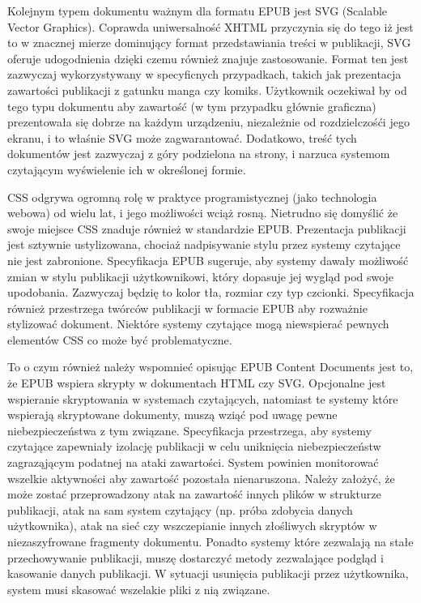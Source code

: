 Kolejnym typem dokumentu ważnym dla formatu EPUB jest SVG (Scalable Vector Graphics). Coprawda uniwersalność XHTML przyczynia się do
tego iż jest to w znacznej mierze dominujący format przedstawiania treści w publikacji, SVG oferuje udogodnienia dzięki czemu również
znajuje zastosowanie. Format ten jest zazwyczaj wykorzystywany w specyficnych przypadkach, takich jak prezentacja zawartości publikacji
z gatunku manga czy komiks. Użytkownik oczekiwał by od tego typu dokumentu aby zawartość (w tym przypadku głównie graficzna) prezentowała
się dobrze na każdym urządzeniu, niezależnie od rozdzielczośći jego ekranu, i to właśnie SVG może zagwarantować. Dodatkowo, treść tych
dokumentów jest zazwyczaj z góry podzielona na strony, i narzuca systemom czytającym wyświelenie ich w określonej formie.

CSS odgrywa ogromną rolę w praktyce programistycznej (jako technologia webowa) od wielu lat, i jego możliwości wciąż rosną. Nietrudno się
domyślić że swoje miejsce CSS znaduje również w standardzie EPUB. Prezentacja publikacji jest sztywnie ustylizowana, chociaż nadpisywanie
stylu przez systemy czytające nie jest zabronione. Specyfikacja EPUB sugeruje, aby systemy dawały możliwość zmian w stylu publikacji
użytkownikowi, który dopasuje jej wygląd pod swoje upodobania. Zazwyczaj będzię to kolor tła, rozmiar czy typ czcionki. Specyfikacja również
przestrzega twórców publikacji w formacie EPUB aby rozważnie stylizować dokument. Niektóre systemy czytające mogą niewspierać pewnych
elementów CSS co może być problematyczne\cite{EPUBContentDocumentsSpecificationCSS}.

To o czym również należy wspomnieć opisując EPUB Content Documents jest to, że EPUB wspiera skrypty w dokumentach HTML czy SVG. Opcjonalne
jest wspieranie skryptowania w systemach czytających, natomiast te systemy które wspierają skryptowane dokumenty, muszą wziąć pod uwagę
pewne niebezpieczeństwa z tym związane. Specyfikacja przestrzega, aby systemy czytające zapewniały izolację publikacji w celu uniknięcia
niebezpieczeństw zagraząjącym podatnej na ataki zawartości. System powinien monitorować wszelkie aktywności aby zawartość pozostała
nienaruszona. Należy założyć, że może zostać przeprowadzony atak na zawartość innych plików w strukturze publikacji, atak na sam system
czytający (np. próba zdobycia danych użytkownika), atak na sieć czy wszczepianie innych złośliwych skryptów w niezaszyfrowane fragmenty
dokumentu. Ponadto systemy które zezwalają na stałe przechowywanie publikacji, muszę dostarczyć metody zezwalające podgląd i kasowanie
danych publikacji. W sytuacji usunięcia publikacji przez użytkownika, system musi skasować wszelakie pliki z nią związane\cite{EPUBContentDocumentsSpecificationJS}.

